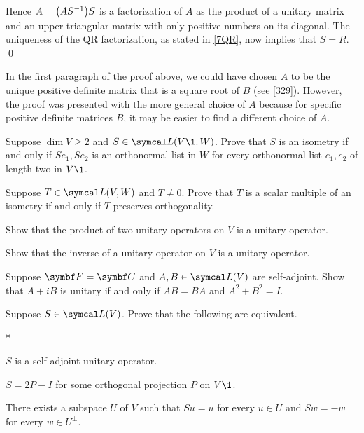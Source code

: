 Hence $A = \paren[\big]{AS^{-1}} S$ is a factorization of $A$ as the product of a unitary matrix and an upper-triangular matrix with only positive numbers on its diagonal. The uniqueness of the QR factorization, as stated in \ref{7QR}, now implies that $S = R$.
\qed

In the first paragraph of the proof above, we could have chosen $A$ to be the unique positive definite matrix that is a square root of $B$ (see \ref{329}). However, the proof was presented with the more general choice of $A$ because for specific positive definite matrices $B$, it may be easier to find a different choice of $A$.

\begin{exercises}

\exercise
Suppose $\dim V \ge 2$ and $S\in \L(V\1, W)$. Prove that $S$ is an isometry if and only if $Se_1, Se_2$ is an orthonormal list in $W$ for every orthonormal list $e_1, e_2$ of length two in $V\1$.\label{2iso}


\exercise
Suppose $T \in \L(V, W)$ and $T \ne 0$. Prove that $T$ is a scalar multiple of an isometry if and only if $T$ preserves orthogonality.

\exercise
\begin{SUBtheorem}
\item
Show that the product of two unitary operators on $V$ is a unitary operator.
\item
Show that the inverse of a unitary operator on $V$ is a unitary operator.
\end{SUBtheorem}


\exercise
Suppose $\F{} = \C{}$ and $A, B \in \L(V)$ are self-adjoint. Show that $A + iB$ is unitary if and only if $AB = BA$ and
$A^2 + B^2 = I$.


\exercise
Suppose $S \in \L(V)$. Prove that the following are equivalent.
\begin{subtheorem}*
\item
$S$ is a self-adjoint unitary operator.
\item
$S = 2P - I$ for some orthogonal projection $P$ on $V\1$.
\item
There exists a subspace $U$ of $V$ such that $Su = u$ for every $u \in U$ and $Sw = -w$ for every $w \in U^\perp\!$.
\end{subtheorem}
\exercisesubtheoremend



\end{exercises}
